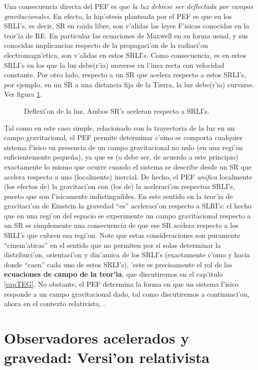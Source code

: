 Una consecuencia directa del PEF es que \textit{la luz debiese ser deflectada por campos gravitacionales}. En efecto, la hip'otesis planteada por el PEF es que en los SRLI's, es decir, SR en caida libre, son v'alidas las leyes F'isicas conocidas en la teor'ia de RE. En particular las ecuaciones de Maxwell en su forma usual, y sus conocidas implicancias respecto de la propagaci'on de la radiaci'on electromagn'etica, son v'alidas en estos SRLI's. Como consecuencia, es en estos SRLI's en los que la luz debe(r'ia) moverse en l'inea recta con velocidad constante. 
 Por otro lado, respecto a un SR que acelera respecto a estos SRLI's, por ejemplo, en un SR a una distancia fija de la Tierra, la luz debe(r'ia) curvarse. Ver figura \ref{fig:PEF-luz}.
\begin{figure}[H]
\centering{}
\caption{Deflexi'on de la luz. Ambos SR's aceleran respecto a SRLI's.}
\label{fig:PEF-luz}
\end{figure}
Tal como en este caso simple, relacionado con la trayectoria de la luz en un campo gravitacional, el PEF permite determinar c'omo se comporta cualquier sistema f'isico en presencia de un campo gravitacional no nulo (en una regi'on suficientemente peque\~na), ya que es (o debe ser, de acuerdo a este principio) exactamente lo mismo que ocurre cuando el sistema se describe desde un SR que acelera respecto a uno (localmente) inercial. De hecho, el PEF \textit{unifica} localmente (los efectos de) la gravitaci'on con (los de) la aceleraci'on respectoa SRLI's, puesto que son f'isicamente indistinguibles. En este sentido en la teor'ia de gravitaci'on de Einstein la gravedad ``es'' aceleraci'on respecto a SLRI's: el hecho que en una regi'on del espacio se experimente un campo gravitacional respecto a un SR es simplemente una consecuencia de que ese SR acelera respecto a los SRLI's que cubren esa regi'on. Note que estas consideraciones son puramente ``cinem'aticas'' en el sentido que no permiten por si solas determinar la distribuci'on, orientaci'on y din'amica de los SRLI's (exactamente c'omo y hacia donde ``caen'' cada uno de estos SRLI's), 'este es precisamente el rol de las \textbf{ecuaciones de campo de la teor'ia}, que discutiremos en el cap'itulo \ref{capTEG}. No obstante, el PEF determina la forma en que un sistema f'isico responde a un campo gravitacional dado, tal como discutiremos a continuaci'on, ahora en el contexto relativista, .

\section{Observadores acelerados y gravedad: Versi'on  relativista}

